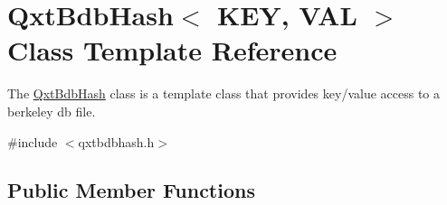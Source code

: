 \hypertarget{class_qxt_bdb_hash}{\section{Qxt\-Bdb\-Hash$<$ K\-E\-Y, V\-A\-L $>$ Class Template Reference}
\label{class_qxt_bdb_hash}
}


The \hyperlink{class_qxt_bdb_hash}{Qxt\-Bdb\-Hash} class is a template class that provides key/value access to a berkeley db file.  




{\ttfamily \#include $<$qxtbdbhash.\-h$>$}

\subsection*{Public Member Functions}
